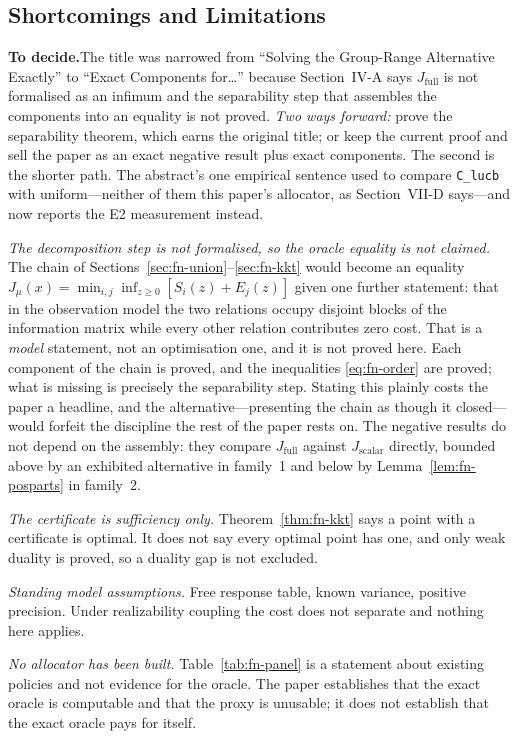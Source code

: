 \documentclass[conference]{IEEEtran}
\theoremstyle{definition}
\newif\ifshownotes\shownotestrue
\newcommand{\TODOPAR}[1]{\ifshownotes\par\vspace{2pt}\noindent%
  {\color{todocol}\textsf{\footnotesize\textbf{To decide.}\;#1}}\par\vspace{2pt}\fi}
\begin{document}
\subsection{Shortcomings and Limitations}
\TODOPAR{The title was narrowed from ``Solving the Group-Range Alternative Exactly'' to
``Exact Components for\dots'' because Section~IV-A says $J_{\mathrm{full}}$ is not formalised
as an infimum and the separability step that assembles the components into an equality is not
proved. \emph{Two ways forward:} prove the separability theorem, which earns the original
title; or keep the current proof and sell the paper as an exact negative result plus exact
components. The second is the shorter path. The abstract's one empirical sentence used to
compare \texttt{C\_lucb} with uniform---neither of them this paper's allocator, as
Section~VII-D says---and now reports the E2 measurement instead.}

\emph{The decomposition step is not formalised, so the oracle equality is not claimed.} The
chain of Sections~\ref{sec:fn-union}--\ref{sec:fn-kkt} would become an equality
$J_{\mu}(x)=\min_{i,j}\inf_{z\ge0}[S_{i}(z)+E_{j}(z)]$ given one further statement: that in
the observation model the two relations occupy disjoint blocks of the information matrix
while every other relation contributes zero cost. That is a \emph{model} statement, not an
optimisation one, and it is not proved here. Each component of the chain is proved, and the
inequalities \eqref{eq:fn-order} are proved; what is missing is precisely the separability step.
Stating this plainly costs the paper a headline, and the alternative---presenting the chain as
though it closed---would forfeit the discipline the rest of the paper rests on. The negative
results do not depend on the assembly: they compare $J_{\mathrm{full}}$ against
$J_{\mathrm{scalar}}$ directly, bounded above by an exhibited alternative in family~1 and
below by Lemma~\ref{lem:fn-posparts} in family~2.

\emph{The certificate is sufficiency only.} Theorem~\ref{thm:fn-kkt} says a point with a
certificate is optimal. It does not say every optimal point has one, and only weak duality is
proved, so a duality gap is not excluded.

\emph{Standing model assumptions.} Free response table, known variance, positive precision.
Under realizability coupling the cost does not separate and nothing here applies.

\emph{No allocator has been built.} Table~\ref{tab:fn-panel} is a statement about existing
policies and not evidence for the oracle. The paper establishes that the exact oracle is
computable and that the proxy is unusable; it does not establish that the exact oracle pays
for itself.
\end{document}
